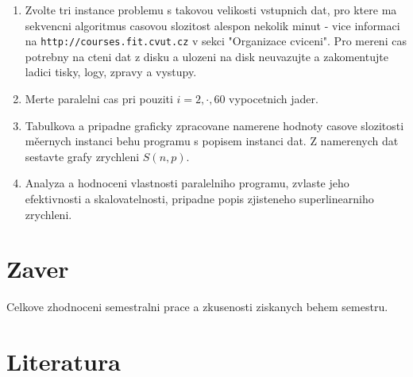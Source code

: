 \begin{enumerate}
\item Zvolte tri instance problemu s takovou velikosti vstupnich dat, pro ktere ma sekvencni
algoritmus casovou slozitost alespon nekolik minut - vice informaci na {\tt http://courses.fit.cvut.cz} v sekci "Organizace cviceni".
Pro mereni cas potrebny na cteni dat z disku a ulozeni na disk neuvazujte a zakomentujte
ladici tisky, logy, zpravy a vystupy.
\item Merte paralelni cas pri pouziti $i=2,\cdot,60$ vypocetnich jader.
\item Tabulkova a pripadne graficky zpracovane namerene hodnoty casove slozitosti měernych instanci behu programu s popisem instanci dat. Z namerenych dat sestavte grafy zrychleni $S(n,p)$.
\item Analyza a hodnoceni vlastnosti paralelniho programu, zvlaste jeho efektivnosti a skalovatelnosti, pripadne popis zjisteneho superlinearniho zrychleni.

\end{enumerate}

\section{Zaver}

Celkove zhodnoceni semestralni prace a zkusenosti ziskanych behem semestru.

\section{Literatura}



